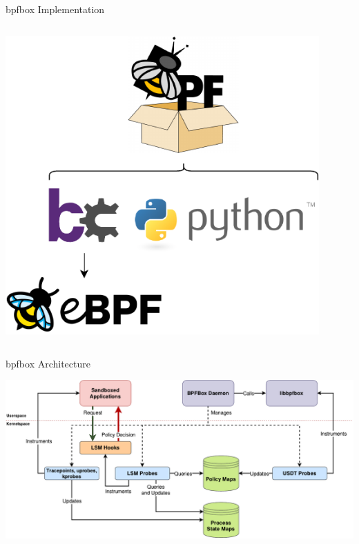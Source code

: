 \documentclass[12pt, dvipsnames, aspectratio=169]{beamer}
\begin{document}
\begin{frame}[c]{bpfbox Implementation}
\begin{columns}
\begin{column}{0.33\textwidth}
\begin{center}
            \includegraphics[width=0.9\textwidth]{figs/at-a-glance.pdf}
        \end{center}
        \vspace{2em}
    \end{column}
\end{columns}
\end{frame}

\begin{frame}[c]{bpfbox Architecture}
\begin{center}
    \color{black}
    \includegraphics[width=1\textwidth]{figs/bpfbox-overview.pdf}
\end{center}
\end{frame}
\end{document}
